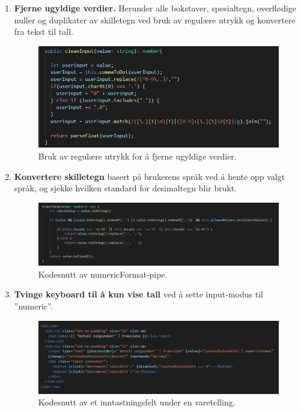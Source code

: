 \begin{enumerate}
    \item \textbf{Fjerne ugyldige verdier.} Herunder alle bokstaver, spesialtegn, overflødige nuller og duplikater av skilletegn ved bruk av regulære utrykk og konvertere fra tekst til tall.
    
    \begin{figure}[H] 
        \centering
        \includegraphics[width=120mm]{figures/Utfordringer/cleanInput.PNG}
        \caption{Bruk av regulære utrykk for å fjerne ugyldige verdier.}
    \end{figure}
    
    \item \textbf{Konvertere skilletegn} basert på brukerens språk ved å hente opp valgt språk, og sjekke hvilken standard for desimaltegn blir brukt.
    
    \begin{figure}[H] 
        \centering
        \includegraphics[width=120mm]{figures/Utfordringer/numericFormat.PNG}
        \caption{Kodesnutt av numericFormat-pipe.}
    \end{figure}
    
    \item \textbf{Tvinge keyboard til å kun vise tall} ved å sette input-modus til ''numeric''.
    
    \begin{figure}[H] 
        \centering
        \includegraphics[width=120mm]{figures/Utfordringer/stock-taking-count-codeSnippet.PNG}
        \caption{Kodesnutt av et inntastningsfelt under en varetelling.}
    \end{figure}
    
\end{enumerate}


